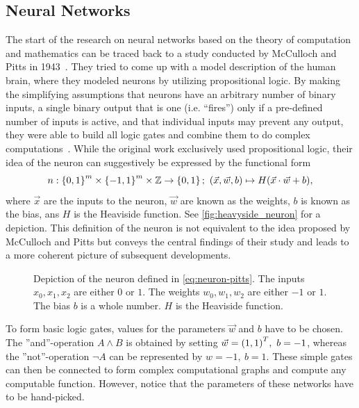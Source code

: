 \subsection{Neural Networks}\label{sec:nn}
The start of the research on neural networks based on the theory of computation and mathematics can be traced back to a study conducted by McCulloch and Pitts in 1943~\cite{McCulloch:1943}. They tried to come up with a model description of the human brain, where they modeled neurons by utilizing propositional logic. By making the simplifying assumptions that neurons have an arbitrary number of binary inputs, a single binary output that is one (i.e. ``fires'') only if a pre-defined number of inputs is active, and that individual inputs may prevent any output, they were able to build all logic gates and combine them to do complex computations~\cite{Piccinini:2004}. While the original work exclusively used propositional logic, their idea of the neuron can suggestively be expressed by the functional form
\begin{equation}\label{eq:neuron-pitts}
n: {\left\{0,1\right\}}^m\times{\left\{-1,1\right\}}^m\times\mathbb{Z} \to\left\{0,1\right\};\ {\left( \vec{x}, \vec{w}, b \right)} \mapsto H{\left( \vec{x}\cdot\vec{w} + b \right)},
\end{equation}
where $\vec{x}$ are the inputs to the neuron, $\vec{w}$ are known as the weights, $b$ is known as the bias, ans $H$ is the Heaviside function. See \autoref{fig:heavyside_neuron} for a depiction. This definition of the neuron is not equivalent to the idea proposed by McCulloch and Pitts but conveys the central findings of their study and leads to a more coherent picture of subsequent developments.

\begin{figure}
	\centering
	
	\caption[McCulloch-Pitts-neuron]{Depiction of the neuron defined in \eqref{eq:neuron-pitts}. The inputs $x_0, x_1, x_2$ are either $0$ or $1$. The weights $w_0, w_1, w_2$ are either $-1$ or $1$. The bias $b$ is a whole number. $H$ is the Heaviside function.}\label{fig:heavyside_neuron}
\end{figure}

To form basic logic gates, values for the parameters $\vec{w}$ and $b$ have to be chosen. The ''and''-operation $A\land B$ is obtained by setting $\vec{w}=\lr{1, 1}^T,\ b=-1$, whereas the ''not''-operation $\neg A$ can be represented by $w=-1,\ b=1$. These simple gates can then be connected to form complex computational graphs and compute any computable function. However, notice that the parameters of these networks have to be hand-picked.

